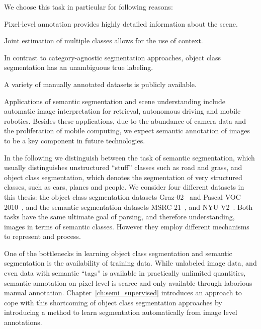 We choose this task in particular for following reasons:
\begin{itemize*}
    \item Pixel-level annotation provides highly detailed information about the scene.
    \item Joint estimation of multiple classes allows for the use of context.
    \item In contrast to category-agnostic segmentation approaches, object class segmentation
        has an unambiguous true labeling.
    \item A variety of manually annotated datasets is publicly available.
\end{itemize*}
%
Applications of semantic segmentation and scene understanding include automatic
image interpretation for retrieval, autonomous driving and mobile robotics.
Besides these applications, due to the abundance of camera data and the
proliferation of mobile computing, we expect semantic annotation of images to
be a key component in future technologies.

In the following we distinguish between the task of semantic segmentation,
which usually distinguishes unstructured ``stuff'' classes such as road and
grass, and object class segmentation, which denotes the segmentation of very
structured classes, such as cars, planes and people. We consider four
different datasets in this thesis: the object class segmentation datasets
Graz-02~\citep{marszatek2007accurate} and Pascal VOC 2010~\citep{pascal}, and the semantic segmentation datasets
MSRC-21~\citep{shotton2006textonboost}, and NYU V2~\citep{SilbermanECCV12}.
%
Both tasks have the same ultimate goal of parsing, and therefore understanding,
images in terms of semantic classes. However they employ different mechanisms
to represent and process.

One of the bottlenecks in learning object class segmentation and semantic
segmentation is the availability of training data.  While unlabeled image data,
and even data with semantic
``tags'' is available in practically unlimited quantities, semantic annotation
on pixel level is scarce and only available through laborious manual annotation. 
Chapter~\ref{ch:semi_supervised} introduces an approach to cope with this
shortcoming of object class segmentation approaches by introducing a method to
learn segmentation automatically from image level annotations.

